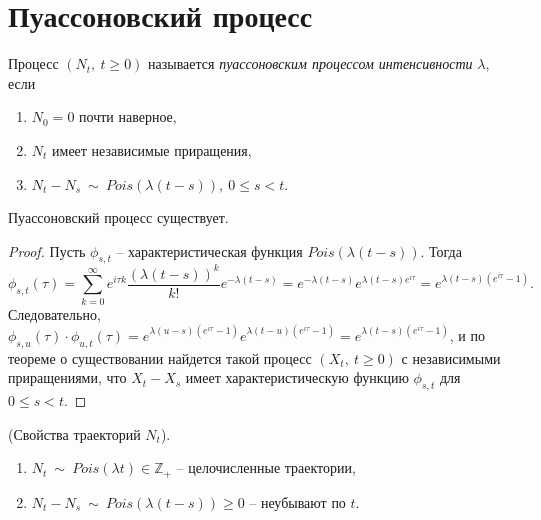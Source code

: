 \section{Пуассоновский процесс}
\begin{definition}
Процесс $\displaystyle ( N_{t} ,\ t\geqslant 0)$ называется \textit{пуассоновским процессом интенсивности }$\displaystyle \lambda $, если

\begin{enumerate}
    \item $\displaystyle N_{0} =0$ почти наверное,
    \item $\displaystyle N_{t}$ имеет независимые приращения,
    \item $\displaystyle N_{t} -N_{s} \ \sim \ Pois( \lambda ( t-s)) ,\ 0\leqslant s< t$.
\end{enumerate}

\end{definition}
\begin{proposition}
Пуассоновский процесс существует.
\end{proposition}
\begin{proof}
Пусть $\displaystyle \phi _{s,t}$ -- характеристическая функция $\displaystyle Pois( \lambda ( t-s))$. Тогда
\begin{equation*}
\phi _{s,t}( \tau ) =\sum _{k=0}^{\infty } e^{i\tau k}\dfrac{( \lambda ( t-s))^{k}}{k!} e^{-\lambda ( t-s)} =e^{-\lambda ( t-s)} e^{\lambda ( t-s) e^{i\tau }} =e^{\lambda ( t-s)\left( e^{i\tau } -1\right)} .
\end{equation*}
Следовательно, $\displaystyle \phi _{s,u}( \tau ) \cdotp \phi _{u,t}( \tau ) =e^{\lambda ( u-s)\left( e^{i\tau } -1\right)} e^{\lambda ( t-u)\left( e^{i\tau } -1\right)} =e^{\lambda ( t-s)\left( e^{i\tau } -1\right)}$, и по теореме о существовании найдется такой процесс $\displaystyle ( X_{t} ,\ t\geqslant 0)$ с независимыми приращениями, что $\displaystyle X_{t} -X_{s}$ имеет характеристическую функцию $\displaystyle \phi _{s,t}$ для $\displaystyle 0\leqslant s< t$.
\end{proof}
\begin{proposition}
(Свойства траекторий $\displaystyle N_{t}$).
\begin{enumerate}
    \item $\displaystyle N_{t} \ \sim \ Pois( \lambda t) \in \mathbb{Z}_{+}$ -- целочисленные траектории,
    \item $\displaystyle N_{t} -N_{s} \ \sim \ Pois( \lambda ( t-s)) \geqslant 0$ -- неубывают по $\displaystyle t$.
\end{enumerate}
\end{proposition}
